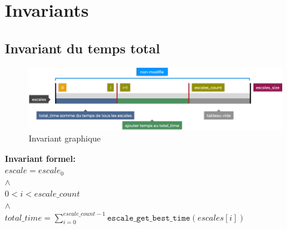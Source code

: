 \section{Invariants}\label{invariants}

\subsection{Invariant du temps total}

\begin{figure}[h]
    \centering
    \includegraphics[width=1\textwidth]{invariant_time.pdf}
    \caption{Invariant graphique}
\end{figure}

\textbf{Invariant formel:} \\
    $escale = escale_0$ \\
    $\land$ \\
    $0 < i < escale\_count$ \\
    $\land$ \\
    $total\_time = \sum_{i=0}^{escale\_count-1} \texttt{escale\_get\_best\_time}(escales[i])$
